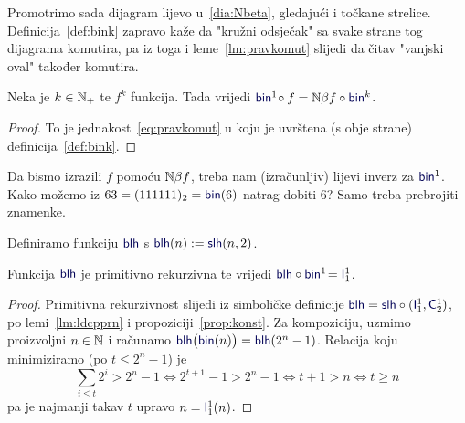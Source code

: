 
Promotrimo sada dijagram lijevo u~\eqref{dia:Nbeta}, gledajući i točkane strelice. Definicija~\ref{def:bink} zapravo kaže da "kružni odsječak" sa svake strane tog dijagrama komutira, pa iz toga i leme~\ref{lm:pravkomut} slijedi da čitav "\!vanjski oval" također komutira.

\begin{korolar}[{name=[brojevni-brojevni dijagram komutira]}]\label{kor:binf=Nbetafbin}
Neka je $k\in{\mathbb N}_+$ te $f^k$ funkcija. Tada vrijedi
    $\f{bin}^1\!\circ f=\N\beta f\circ\f{bin}^k$.
\end{korolar}
\begin{proof}
To je jednakost~\eqref{eq:pravkomut} u koju je uvrštena (s obje strane) definicija~\ref{def:bink}.
\end{proof}


Da bismo izrazili $f$ pomoću ${\mathbb N}\beta f$, treba nam (izračunljiv) lijevi inverz za $\f{bin}^1$. Kako možemo iz $63=(111111)_2=\f{bin}(6)$ natrag dobiti $6$? Samo treba prebrojiti znamenke.

\begin{lema}[{name=[primitivna rekurzivnost i specifikacija duljine binarnog zapisa]}]\label{lm:blh}
Definiramo funkciju $\f{blh}$ s $\f{blh}(n):=\f{slh}(n,2)$.

Funkcija $\f{blh}$ je primitivno rekurzivna te vrijedi $\f{blh}\circ\f{bin}^1\!=\f I_1^1$.
\end{lema}
\begin{proof}
Primitivna rekurzivnost slijedi iz simboličke definicije $\f{blh}=\f{slh}\circ(\f I_1^1,\f C_2^1)$, po lemi~\ref{lm:ldcpprn} i propoziciji~\ref{prop:konst}.
Za kompoziciju, uzmimo proizvoljni $n\in{\mathbb N}$ i računamo $\f{blh}\bigl(\f{bin}(n)\bigr)=\f{blh}(2^n-1)$. Relacija koju minimiziramo (po $t\le 2^n-1$) je
\begin{equation}
    \textstyle\sum_{i\le t}2^i>2^n-1
    \Longleftrightarrow
    2^{t+1}-1>2^n-1
    \Longleftrightarrow
    t+1>n
    \Longleftrightarrow
    t\ge n
\end{equation}
pa je najmanji takav $t$ upravo $n=\f I_1^1(n)$.\qedhere
\end{proof}

